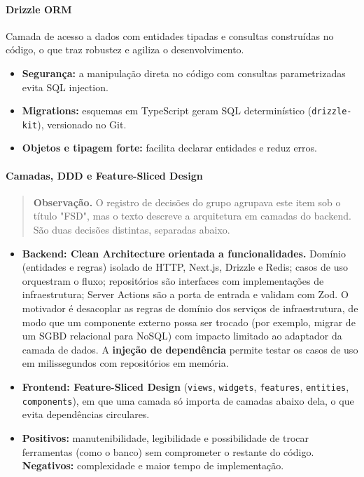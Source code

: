 \documentclass[
  brazilian,
  11pt,
]{article}
\providecommand{\tightlist}{%
  \setlength{\itemsep}{0pt}\setlength{\parskip}{0pt}}
\begin{document}
\paragraph{Drizzle ORM}\label{drizzle-orm}

Camada de acesso a dados com entidades tipadas e consultas construídas no código, o que traz robustez e agiliza o desenvolvimento.

\begin{itemize}
\tightlist
\item
  \textbf{Segurança:} a manipulação direta no código com consultas parametrizadas evita SQL injection.
\item
  \textbf{Migrations:} esquemas em TypeScript geram SQL determinístico (\texttt{drizzle-kit}), versionado no Git.
\item
  \textbf{Objetos e tipagem forte:} facilita declarar entidades e reduz erros.
\end{itemize}

\paragraph{Camadas, DDD e Feature-Sliced Design}\label{camadas-ddd-e-feature-sliced-design}

\begin{quote}
\textbf{Observação.} O registro de decisões do grupo agrupava este item sob o título "FSD", mas o texto descreve a arquitetura em camadas do backend. São duas decisões distintas, separadas abaixo.
\end{quote}

\begin{itemize}
\tightlist
\item
  \textbf{Backend: Clean Architecture orientada a funcionalidades.} Domínio (entidades e regras) isolado de HTTP, Next.js, Drizzle e Redis; casos de uso orquestram o fluxo; repositórios são interfaces com implementações de infraestrutura; Server Actions são a porta de entrada e validam com Zod. O motivador é desacoplar as regras de domínio dos serviços de infraestrutura, de modo que um componente externo possa ser trocado (por exemplo, migrar de um SGBD relacional para NoSQL) com impacto limitado ao adaptador da camada de dados. A \textbf{injeção de dependência} permite testar os casos de uso em milissegundos com repositórios em memória.
\item
  \textbf{Frontend: Feature-Sliced Design} (\texttt{views}, \texttt{widgets}, \texttt{features}, \texttt{entities}, \texttt{components}), em que uma camada só importa de camadas abaixo dela, o que evita dependências circulares.
\item
  \textbf{Positivos:} manutenibilidade, legibilidade e possibilidade de trocar ferramentas (como o banco) sem comprometer o restante do código. \textbf{Negativos:} complexidade e maior tempo de implementação.
\end{itemize}
\end{document}
